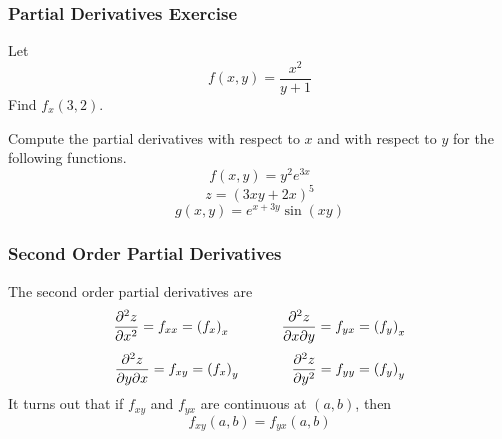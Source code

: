 \documentclass[xcolor=dvipsnames]{beamer}
\begin{document}
\begin{frame}
  \frametitle{Partial Derivatives Exercise}
  {\ubung} Let
  \begin{equation}
    \label{eq:oacheapo}
    f(x,y)=\frac{x^{2}}{y+1}
  \end{equation}
  Find $f_{x}(3,2)$.

  \bigskip

  {\ubung} Compute the partial derivatives with respect to $x$ and
  with respect to $y$ for the following functions.
  \begin{equation}
    \label{eq:phiwoowe}
    f(x,y)=y^{2}e^{3x}
  \end{equation}
  \begin{equation}
    \label{eq:uphaijei}
    z=(3xy+2x)^{5}
  \end{equation}
  \begin{equation}
    \label{eq:geebeshi}
    g(x,y)=e^{x+3y}\sin(xy)
  \end{equation}
\end{frame}

\begin{frame}
  \frametitle{Second Order Partial Derivatives}
  The \alert{second order partial derivatives} are
  \begin{equation}
    \label{eq:eshaipie}
    \frac{\partial^{2}z}{\partial{}x^{2}}=f_{xx}=\left(f_{x}\right)_{x}\hspace{0.5in}\frac{\partial^{2}z}{\partial{}x\partial{}y}=f_{yx}=\left(f_{y}\right)_{x}
  \end{equation}
  \begin{equation}
    \label{eq:waukahna}
    \frac{\partial^{2}z}{\partial{}y\partial{}x}=f_{xy}=\left(f_{x}\right)_{y}\hspace{0.5in}\frac{\partial^{2}z}{\partial{}y^{2}}=f_{yy}=\left(f_{y}\right)_{y}
  \end{equation}
  It turns out that if $f_{xy}$ and $f_{yx}$ are continuous at
  $(a,b)$, then
  \begin{equation}
    \label{eq:ahbahxuj}
    f_{xy}(a,b)=f_{yx}(a,b)
  \end{equation}
\end{frame}
\end{document}

